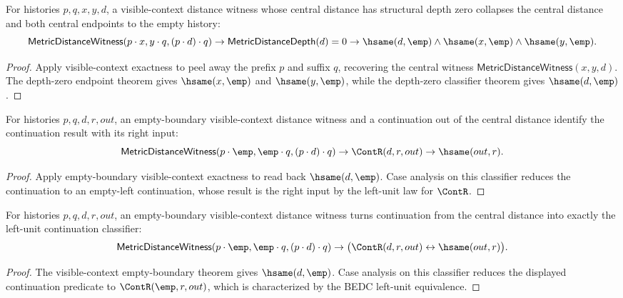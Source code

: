 \begin{theorem}
\label{thm:metric-distance-witness-visible-context-depth-zero-collapse}
For histories $p,q,x,y,d$, a visible-context distance witness whose central
distance has structural depth zero collapses the central distance and both
central endpoints to the empty history:
$$
\mathsf{MetricDistanceWitness}(p\cdot x,y\cdot q,(p\cdot d)\cdot q)
\to
\mathsf{MetricDistanceDepth}(d)=0
\to
\hsame(d,\emp)\land\hsame(x,\emp)\land\hsame(y,\emp).
$$
\end{theorem}
\begin{proof}
Apply visible-context exactness to peel away the prefix $p$ and suffix $q$,
recovering the central witness $\mathsf{MetricDistanceWitness}(x,y,d)$. The
depth-zero endpoint theorem gives $\hsame(x,\emp)$ and $\hsame(y,\emp)$, while
the depth-zero classifier theorem gives $\hsame(d,\emp)$.
\end{proof}

\begin{theorem}
\label{thm:metric-distance-witness-empty-boundary-visible-context-continuation-left-unit-result}
For histories $p,q,d,r,out$, an empty-boundary visible-context distance witness
and a continuation out of the central distance identify the continuation result
with its right input:
$$
\mathsf{MetricDistanceWitness}(p\cdot\emp,\emp\cdot q,(p\cdot d)\cdot q)
\to
\ContR(d,r,out)
\to
\hsame(out,r).
$$
\end{theorem}
\begin{proof}
Apply empty-boundary visible-context exactness to read back
$\hsame(d,\emp)$. Case analysis on this classifier reduces the continuation to
an empty-left continuation, whose result is the right input by the left-unit
law for $\ContR$.
\end{proof}

\begin{theorem}
\label{thm:metric-empty-boundary-continuation-left-unit-iff}
For histories $p,q,d,r,out$, an empty-boundary visible-context distance witness
turns continuation from the central distance into exactly the left-unit
continuation classifier:
$$
\mathsf{MetricDistanceWitness}(p\cdot\emp,\emp\cdot q,(p\cdot d)\cdot q)
\to
\bigl(\ContR(d,r,out)\leftrightarrow\hsame(out,r)\bigr).
$$
\end{theorem}
\begin{proof}
The visible-context empty-boundary theorem gives $\hsame(d,\emp)$. Case analysis
on this classifier reduces the displayed continuation predicate to
$\ContR(\emp,r,out)$, which is characterized by the BEDC left-unit equivalence.
\end{proof}

